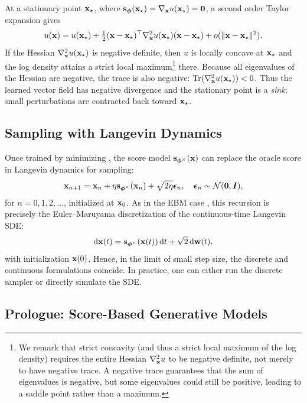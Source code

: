 At a stationary point ${\mathbf{x}}_\star$, where ${\mathbf{s}}_{\bm\phi}({\mathbf{x}}_\star)=\nabla_{{\mathbf{x}}}u({\mathbf{x}}_\star)=\mathbf{0}$,
a second order Taylor expansion gives
\[
u({\mathbf{x}})
= u({\mathbf{x}}_\star)
+ \tfrac12({\mathbf{x}}-{\mathbf{x}}_\star)^\top \nabla_{{\mathbf{x}}}^2 u({\mathbf{x}}_\star)({\mathbf{x}}-{\mathbf{x}}_\star)
+ o(\|{\mathbf{x}}-{\mathbf{x}}_\star\|^2).
\]
If the Hessian $\nabla_{{\mathbf{x}}}^2 u({\mathbf{x}}_\star)$ is negative definite, then $u$ is locally concave at
${\mathbf{x}}_\star$ and the log density attains a strict local maximum\footnote{We remark that strict concavity (and thus a strict local maximum of the log density) requires the entire Hessian
$\nabla_{{\mathbf{x}}}^2 u$ to be negative definite, not merely to have negative trace.
A negative trace guarantees that the sum of eigenvalues is negative, but some eigenvalues could still
be positive, leading to a saddle point rather than a maximum.
} there.
Because all eigenvalues of the Hessian are negative, the trace is also negative:
$\operatorname{Tr}(\nabla_{{\mathbf{x}}}^2 u({\mathbf{x}}_\star))<0$.
Thus the learned vector field has negative divergence and the stationary point is a \emph{sink}:
small perturbations are contracted back toward ${\mathbf{x}}_\star$.





\subsection{Sampling with Langevin Dynamics}
Once trained by minimizing , the score model ${\mathbf{s}}_{\bm{\phi}^\times}({\mathbf{x}})$ can replace the oracle score in Langevin dynamics for sampling:
\begin{align}\label{eq:score-langevin-emp}
    \mathbf{x}_{n+1} = \mathbf{x}_n + \eta   {\mathbf{s}}_{\bm{\phi}^\times}({\mathbf{x}}_n) + \sqrt{2\eta}    \bm{\epsilon}_n, \quad \bm{\epsilon}_n \sim \mathcal{N}(\bm{0}, \bm{I}),
\end{align}
for $n=0,1,2,\dots$, initialized at ${\mathbf{x}}_0$. As in the EBM case , this recursion is precisely the Euler–Maruyama discretization of the continuous-time Langevin SDE:
\begin{align*}
    \mathop{}\!\mathrm{d} {\mathbf{x}}(t) = {\mathbf{s}}_{\bm{\phi}^\times}({\mathbf{x}}(t)) \mathop{}\!\mathrm{d} t + \sqrt{2} \mathop{}\!\mathrm{d} \mathbf{w}(t),
\end{align*}
with initialization ${\mathbf{x}}(0)$. Hence, in the limit of small step size, the discrete and continuous formulations coincide.  In practice, one can either run the discrete sampler or directly simulate the SDE.



\subsection{Prologue: Score-Based Generative Models}

